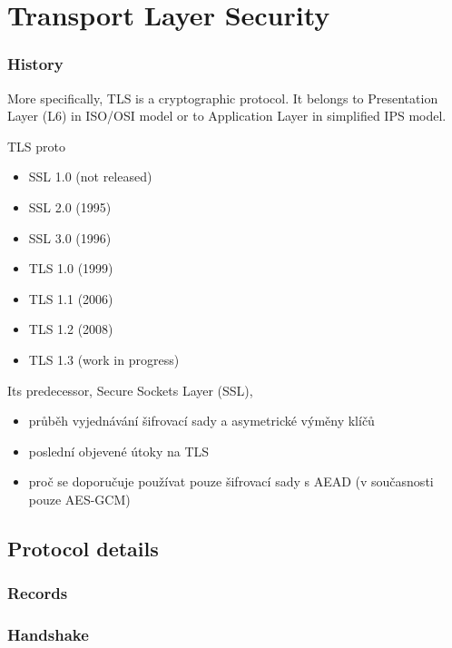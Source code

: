 \chapter{Transport Layer Security}






\subsection{History}

More specifically, TLS is a cryptographic protocol. It belongs to Presentation Layer (L6) in ISO/OSI model or to Application Layer in simplified IPS model.

TLS proto

\begin{itemize}
  \item SSL 1.0 (not released)
  \item SSL 2.0 (1995)
  \item SSL 3.0 (1996)
  \item TLS 1.0 (1999)
  \item TLS 1.1 (2006)
  \item TLS 1.2 (2008)
  \item TLS 1.3 (work in progress)
\end{itemize}

Its predecessor, Secure Sockets Layer (SSL),


\begin{itemize}
  \item průběh vyjednávání šifrovací sady a asymetrické výměny klíčů
  \item poslední objevené útoky na TLS
  \item proč se doporučuje používat pouze šifrovací sady s AEAD (v současnosti pouze AES-GCM)
\end{itemize}





\section{Protocol details}

\subsection{Records}

\subsection{Handshake}



